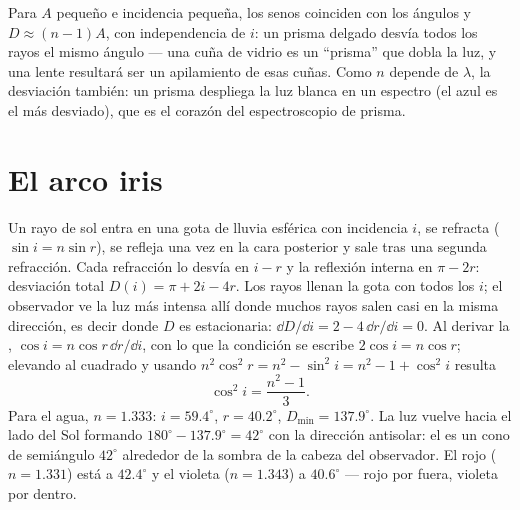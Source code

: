 \begin{remark}\label{rem:b1:rays-reflection-refraction:thin}
Para $A$ pequeño e incidencia pequeña, los senos coinciden con los ángulos
y $D \approx (n - 1)A$, con independencia de $i$: un prisma delgado desvía
todos los rayos el mismo ángulo --- una cuña de vidrio es un ``prisma''
que dobla la luz, y una lente resultará ser un apilamiento de esas cuñas.
Como $n$ depende de $\lambda$, la desviación también: un prisma despliega
la luz blanca en un espectro (el azul es el más desviado), que es el
corazón del espectroscopio de prisma.
\end{remark}

\section{El arco iris}

\begin{example}\label{ex:b1:rays-reflection-refraction:rainbow}
Un rayo de sol entra en una gota de lluvia esférica con incidencia $i$, se
refracta ($\sin i = n\sin r$), se refleja una vez en la cara posterior y
sale tras una segunda refracción. Cada refracción lo desvía en
$i - r$ y la reflexión interna en $\pi - 2r$: desviación total
$D(i) = \pi + 2i - 4r$. Los rayos llenan la gota con todos los $i$; el
observador ve la luz más intensa allí donde muchos rayos salen casi en la
misma dirección, es decir donde $D$ es estacionaria: $\dd D/\dd i = 2 - 4\,\dd r/\dd i
= 0$. Al derivar la ,
$\cos i = n\cos r\,\dd r/\dd i$, con lo que la condición se escribe
$2\cos i = n\cos r$; elevando al cuadrado y usando
$n^2\cos^2 r = n^2 - \sin^2 i = n^2 - 1 + \cos^2 i$ resulta
\[
\cos^2 i = \frac{n^2 - 1}{3} .
\]
Para el agua, $n = 1.333$: $i = 59.4^\circ$, $r = 40.2^\circ$,
$D_{\min} = 137.9^\circ$. La luz vuelve hacia el lado del Sol formando
$180^\circ - 137.9^\circ = 42^\circ$ con la dirección antisolar: el  es un cono de semiángulo $42^\circ$ alrededor de la sombra de la
cabeza del observador. El rojo ($n = 1.331$) está a $42.4^\circ$ y el
violeta ($n = 1.343$) a $40.6^\circ$ --- rojo por fuera, violeta por dentro.
\end{example}

